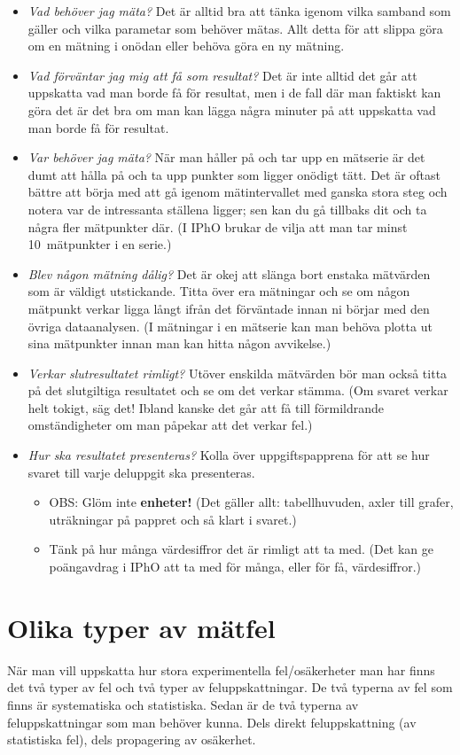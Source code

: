 \documentclass[11pt,a4paper, swedish
]{article}
\begin{document}
\begin{itemize}
\item \emph{Vad behöver jag mäta?} Det är alltid bra att tänka igenom
  vilka samband som gäller och vilka parametar som behöver mätas. Allt
  detta för att slippa göra om en mätning i onödan eller behöva göra
  en ny mätning.
\item \emph{Vad förväntar jag mig att få som resultat?} Det är inte
  alltid det går att uppskatta vad man borde få för resultat, men i de
  fall där man faktiskt kan göra det är det bra om man kan lägga några
  minuter på att uppskatta vad man borde få för resultat. 
\item \emph{Var behöver jag mäta?} När man håller på och tar upp en
  mätserie är det dumt att hålla på och ta upp punkter som ligger
  onödigt tätt. Det är oftast bättre att börja med att gå igenom
  mätintervallet med ganska stora steg och notera var de
  intressanta ställena ligger; sen kan du gå tillbaks dit och ta några
  fler mätpunkter där. (I IPhO brukar de vilja att man tar minst
  10~mätpunkter i en serie.)
\item \emph{Blev någon mätning dålig?} Det är okej att slänga bort
  enstaka mätvärden som är väldigt utstickande. Titta över era
  mätningar och se om någon mätpunkt verkar ligga långt ifrån det
  förväntade innan ni börjar med den övriga dataanalysen. (I mätningar
  i en mätserie kan man behöva plotta ut sina mätpunkter innan man kan
  hitta någon avvikelse.)
\item \emph{Verkar slutresultatet rimligt?} Utöver enskilda mätvärden
  bör man också titta på det slutgiltiga resultatet och se om det
  verkar stämma. (Om svaret verkar helt tokigt, säg det! Ibland kanske
  det går att få till förmildrande omständigheter om man påpekar att
  det verkar fel.)
\item \emph{Hur ska resultatet presenteras?} Kolla över
  uppgiftspapprena för att se hur svaret till varje deluppgit ska
  presenteras.
  \begin{itemize}
  \item OBS: Glöm inte \textbf{enheter!} (Det gäller allt:
  tabellhuvuden, axler till grafer, uträkningar på pappret och så
  klart i svaret.)
  \item Tänk på hur många värdesiffror det är rimligt att ta
    med. (Det kan ge poängavdrag i IPhO att ta med för många, eller
    för få, värdesiffror.)
  \end{itemize}
\end{itemize}

\section{Olika typer av mätfel}\label{sec:matfel}
När man vill uppskatta hur stora experimentella fel/osäkerheter man
har finns det två typer av fel och två typer av feluppskattningar. De
två typerna av fel som finns är systematiska och statistiska. Sedan är
de två typerna av feluppskattningar som man behöver kunna. Dels direkt
feluppskattning (av statistiska fel), dels propagering av osäkerhet. 
\end{document}
